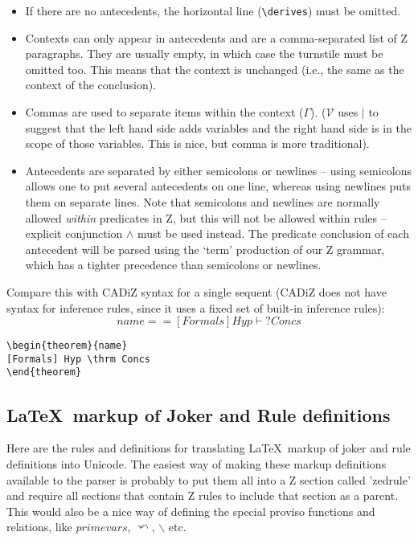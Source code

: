 \documentclass{article}
\newcommand{\V}{\mathcal{V}}
\newcommand{\derives}{\derive{}}
\newcommand{\Context}{\Gamma}
\newcommand{\notfreein}{\mathbin{\backslash}}
\newcommand{\substitute}{\mathrel{\curvearrowleft}}  %
\begin{document}
\begin{itemize}
\item 
  If there are no antecedents, the horizontal line (\verb!\derives!)
  must be omitted.
\item Contexts can only appear in antecedents and are a comma-separated
  list of Z paragraphs.  They are usually empty, in which case the
  turnstile must be omitted too.  This means that the context is
  unchanged (i.e., the same as the context of the conclusion).
\item Commas are used to separate items within the context ($\Context$).
  ($\V$ uses $|$ to suggest that the left hand side adds variables
  and the right hand side is in the scope of those variables.  This
  is nice, but comma is more traditional).
\item Antecedents are separated by either semicolons or newlines
  -- using semicolons allows one to put several antecedents on
  one line, whereas using newlines puts them on separate lines.
  Note that semicolons and newlines are normally allowed \emph{within}
  predicates in Z, but this will not be allowed within rules 
  -- explicit conjunction $\land$ must be used instead.  
  The predicate conclusion of each antecedent 
  will be parsed using the `term' production of our Z grammar, which
  has a tighter precedence than semicolons or newlines.
\end{itemize}

Compare this with CADiZ syntax for a single sequent
(CADiZ does not have syntax for inference rules, since
it uses a fixed set of built-in inference rules):
\[ name == [Formals] Hyp \vdash? Concs \]
\begin{verbatim}
\begin{theorem}{name}
[Formals] Hyp \thrm Concs
\end{theorem}
\end{verbatim}


\subsection{\LaTeX\ markup of Joker and Rule definitions}

Here are the rules and definitions for translating \LaTeX\ markup
of joker and rule definitions into Unicode.  The easiest way
of making these markup definitions available to the parser is 
probably to put them all into a Z section called 'zedrule'
and require all sections that contain Z rules to include that
section as a parent.  This would also be a nice way of defining
the special proviso functions and relations, 
like $primevars$, $\substitute$, $\notfreein$ etc.
\end{document}
